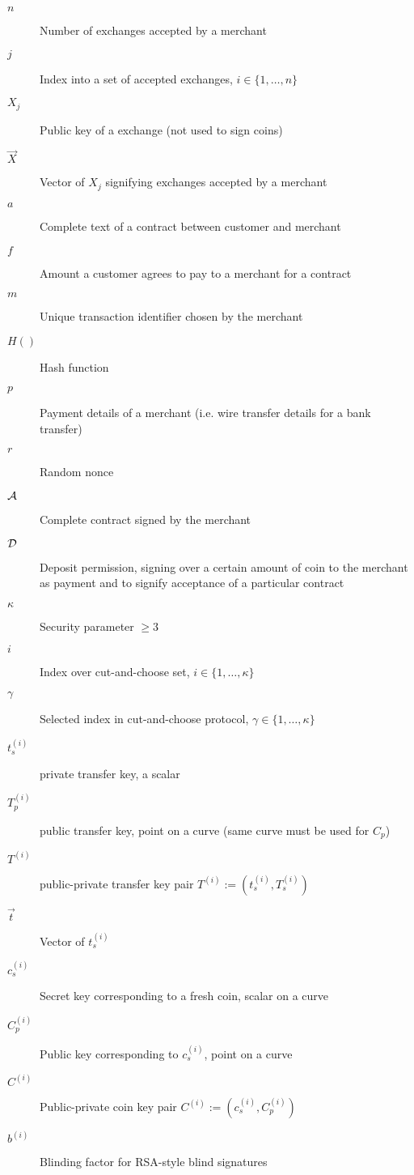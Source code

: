 \documentclass{llncs}
\begin{document}
\begin{description}
  \item[$n$]{Number of exchanges accepted by a merchant}
  \item[$j$]{Index into a set of accepted exchanges, $i \in \{1,\ldots,n\}$}
  \item[$X_j$]{Public key of a exchange (not used to sign coins)}
  \item[$\vec{X}$]{Vector of $X_j$ signifying exchanges accepted by a merchant}
  \item[$a$]{Complete text of a contract between customer and merchant}
  \item[$f$]{Amount a customer agrees to pay to a merchant for a contract}
  \item[$m$]{Unique transaction identifier chosen by the merchant}
  \item[$H()$]{Hash function}
  \item[$p$]{Payment details of a merchant (i.e. wire transfer details for a bank transfer)}
  \item[$r$]{Random nonce}
  \item[${\cal A}$]{Complete contract signed by the merchant}
  \item[${\cal D}$]{Deposit permission, signing over a certain amount of coin to the merchant as payment and to signify acceptance of a particular contract}
  \item[$\kappa$]{Security parameter $\ge 3$}
  \item[$i$]{Index over cut-and-choose set, $i \in \{1,\ldots,\kappa\}$}
  \item[$\gamma$]{Selected index in cut-and-choose protocol, $\gamma \in \{1,\ldots,\kappa\}$}
  \item[$t^{(i)}_s$]{private transfer key, a scalar}
  \item[$T^{(i)}_p$]{public transfer key, point on a curve (same curve must be used for $C_p$)}
  \item[$T^{(i)}$]{public-private transfer key pair $T^{(i)} := (t^{(i)}_s,T^{(i)}_s)$}
  \item[$\vec{t}$]{Vector of $t^{(i)}_s$}
  \item[$c_s^{(i)}$]{Secret key corresponding to a fresh coin, scalar on a curve}
  \item[$C_p^{(i)}$]{Public key corresponding to $c_s^{(i)}$, point on a curve}
  \item[$C^{(i)}$]{Public-private coin key pair $C^{(i)} := (c_s^{(i)}, C_p^{(i)})$}
  \item[$b^{(i)}$]{Blinding factor for RSA-style blind signatures}

\end{description}
\end{document}
